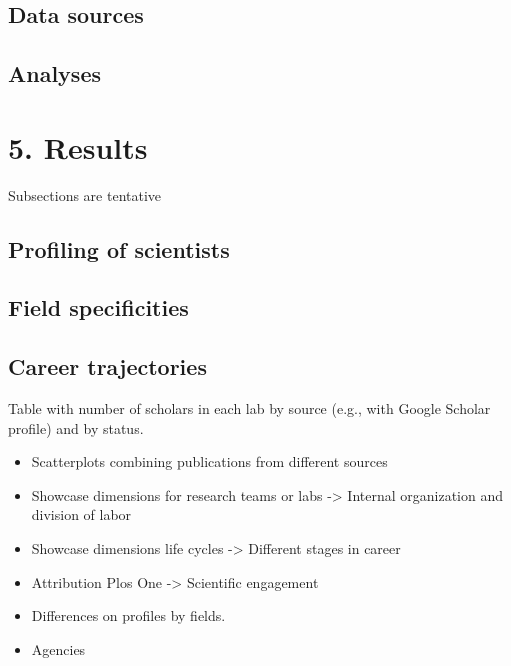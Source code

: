 \documentclass[]{elsarticle} %
\begin{document}
\hypertarget{data-sources}{%
\subsection{Data sources}\label{data-sources}}

\hypertarget{analyses}{%
\subsection{Analyses}\label{analyses}}

\hypertarget{results}{%
\section{5. Results}\label{results}}

Subsections are tentative

\hypertarget{profiling-of-scientists}{%
\subsection{Profiling of scientists}\label{profiling-of-scientists}}

\hypertarget{field-specificities}{%
\subsection{Field specificities}\label{field-specificities}}

\hypertarget{career-trajectories}{%
\subsection{Career trajectories}\label{career-trajectories}}

Table with number of scholars in each lab by source (e.g., with Google
Scholar profile) and by status.

\begin{itemize}
\item
  Scatterplots combining publications from different sources
\item
  Showcase dimensions for research teams or labs -\textgreater{}
  Internal organization and division of labor
\item
  Showcase dimensions life cycles -\textgreater{} Different stages in
  career
\item
  Attribution Plos One -\textgreater{} Scientific engagement
\item
  Differences on profiles by fields.
\item
  Agencies
\end{itemize}
\end{document}

